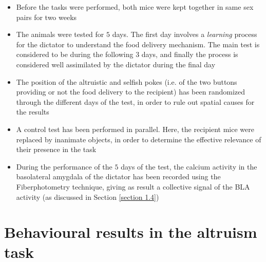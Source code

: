 \documentclass[12pt, a4paper]{report}
\begin{document}
\begin{itemize}
	
	\item Before the tasks were performed, both mice were kept together in same sex pairs for two weeks 
	
	\item The animals were tested for $5$ days. The first day involves a \textit{learning} process for the dictator to understand the food delivery mechanism. The main test is considered to be during the following $3$ days, and finally the process is considered well assimilated by the dictator during the final day	
	
	\item The position of the altruistic and selfish pokes (i.e. of the two buttons providing or not the food delivery to the recipient) has been randomized through the different days of the test, in order to rule out spatial causes for the results
	
	\item A control test has been performed in parallel. Here, the recipient mice were replaced by inanimate objects, in order to determine the effective relevance of their presence in the task
	
	\item During the performance of the $5$ days of the test, the calcium activity in the basolateral amygdala of the dictator has been recorded using the Fiberphotometry technique, giving as result a collective signal of the BLA activity (as discussed in Section \ref{section 1.4})
	
\end{itemize}



\section{Behavioural results in the altruism task}
\end{document}
